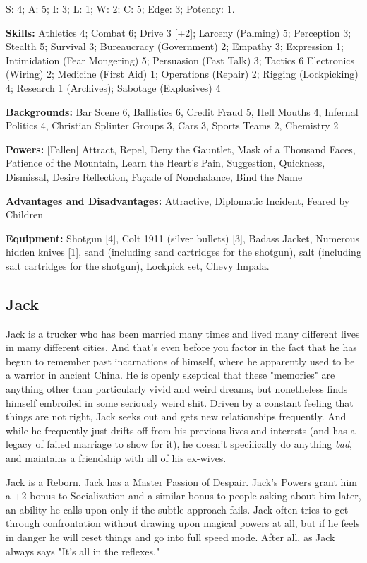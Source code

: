 S: 4; A: 5; I: 3; L: 1; W: 2; C: 5; Edge: 3; Potency: 1.

\textbf{Skills:} Athletics 4; Combat 6; Drive 3 [+2]; Larceny (Palming) 5; Perception 3; Stealth 5; Survival 3; 
Bureaucracy (Government) 2; Empathy 3; Expression 1; Intimidation (Fear Mongering) 5; Persuasion (Fast Talk) 3; Tactics 6
Electronics (Wiring) 2; Medicine (First Aid) 1; Operations (Repair) 2; Rigging (Lockpicking) 4; Research 1 (Archives); Sabotage (Explosives) 4

\textbf{Backgrounds:} Bar Scene 6, Ballistics 6, Credit Fraud 5, Hell Mouths 4, Infernal Politics 4, Christian Splinter Groups 3, Cars 3, Sports Teams 2, Chemistry 2

\textbf{Powers:} [Fallen] Attract, Repel, Deny the Gauntlet, Mask of a Thousand Faces, Patience of the Mountain, Learn the Heart's Pain, Suggestion, Quickness, Dismissal, Desire Reflection, Fa\c{c}ade of Nonchalance, Bind the Name

\textbf{Advantages and Disadvantages:} Attractive, Diplomatic Incident, Feared by Children

\textbf{Equipment:} Shotgun [4], Colt 1911 (silver bullets) [3], Badass Jacket, Numerous hidden knives [1], sand (including sand cartridges for the shotgun), salt (including salt cartridges for the shotgun), Lockpick set, Chevy Impala.

\subsection{Jack}
\hspace{\parindent} Jack is a trucker who has been married many times and lived many different lives in many different cities. And that's even before you factor in the fact that he has begun to remember past incarnations of himself, where he apparently used to be a warrior in ancient China. He is openly skeptical that these "memories" are anything other than particularly vivid and weird dreams, but nonetheless finds himself embroiled in some seriously weird shit. Driven by a constant feeling that things are not right, Jack seeks out and gets new relationships frequently. And while he frequently just drifts off from his previous lives and interests (and has a legacy of failed marriage to show for it), he doesn't specifically do anything \textit{bad}, and maintains a friendship with all of his ex-wives.

Jack is a Reborn. Jack has a Master Passion of Despair. Jack's Powers grant him a +2 bonus to Socialization and a similar bonus to people asking about him later, an ability he calls upon only if the subtle approach fails. Jack often tries to get through confrontation without drawing upon magical powers at all, but if he feels in danger he will reset things and go into full speed mode. After all, as Jack always says "It's all in the reflexes."

